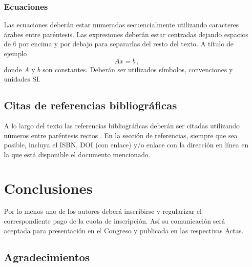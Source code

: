 \documentclass[11pt, a4paper, twoside]{article}
\begin{document}
\subsubsection{Ecuaciones}

Las ecuaciones deberán estar numeradas secuencialmente utilizando caracteres árabes entre paréntesis. Las expresiones deberán estar centradas dejando espacios de 6 por encima y por debajo para separarlas del resto del texto. A título de ejemplo 
%
\begin{equation}
Ax = b \,,
\label{eq:eq1}
\end{equation}
%
donde $A$ y $b$ son constantes. Deberán ser utilizados símbolos, convenciones y unidades SI.


\subsection{Citas de referencias bibliográficas}

A lo largo del texto las referencias bibliográficas deberán ser citadas utilizando números entre paréntesis rectos \cite{Fonseca-2013,ref2,TADEU2006,ref4,refBranco,ref6,Brebbia}. En la sección de referencias, siempre que sea posible, incluya el ISBN, DOI (con enlace) y/o enlace con la dirección en línea en la que está disponible el documento mencionado.

\section{Conclusiones}

Por lo menos uno de los autores deberá inscribirse y regularizar el correspondiente pago de la cuota de inscripción. Así su comunicación será aceptada para presentación en el Congreso y publicada en las respectivas Actas.

\subsection*{Agradecimientos}
\end{document}
